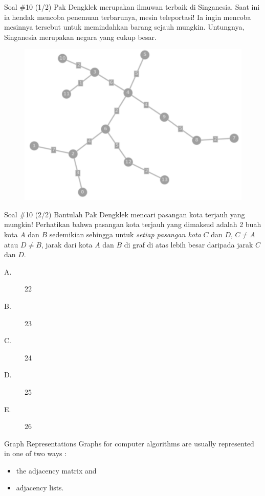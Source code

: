 \documentclass[english,t]{beamer}
\begin{document}
	\begin{frame}{Soal \#10 (1/2)}
		Pak Dengklek merupakan ilmuwan terbaik di Singanesia. Saat ini ia hendak mencoba penemuan terbarunya, mesin teleportasi! Ia ingin mencoba mesinnya tersebut untuk memindahkan barang sejauh mungkin. Untungnya, Singanesia merupakan negara yang cukup besar.
		\begin{figure}[!ht]
			\centering
			\includegraphics[scale=.1675]{images/singanesia}
		\end{figure}

	\end{frame}
	
\begin{frame}{Soal \#10 (2/2)}
	Bantulah Pak Dengklek mencari pasangan kota terjauh yang mungkin! Perhatikan bahwa pasangan kota terjauh yang dimaksud adalah 
	2 buah kota $A$ dan $B$ sedemikian sehingga untuk \textit{setiap pasangan kota} $C$ dan $D$, $C \neq A$ atau $D \neq B$, jarak dari kota $A$ dan $B$ di graf di atas lebih besar daripada jarak $C$ dan $D$.
		\begin{description}
	\item[A.] 22
	\item[B.] 23
	\item[C.] 24
	\item[D.] 25
	\item[E.] 26
\end{description}		
\end{frame}

\begin{frame}{Graph Representations}
	Graphs for computer algorithms are usually represented in one of two ways \citep{levitin2012introduction}: 
	\begin{itemize}
		\item<2-> the adjacency matrix and
		\item<3-> adjacency lists.
	\end{itemize}  
\end{frame}
\end{document}
